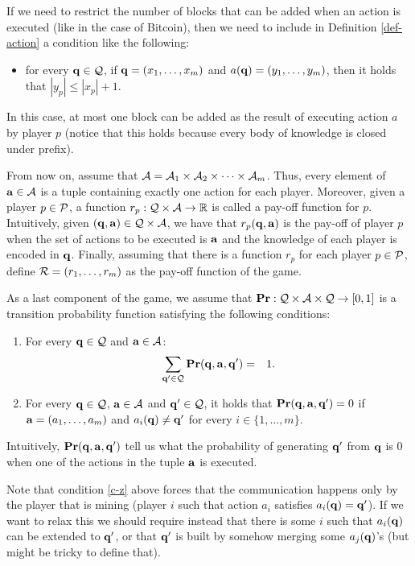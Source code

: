 If we need to restrict the number of blocks that can be added when an action is executed (like in the case of Bitcoin), then we need to include in Definition \ref{def-action} a condition like the following:
\begin{itemize}
\item for every $\mathbf{q} \in \mathcal{Q}$, if $\mathbf{q} = (x_1, \ldots, x_m)$ and $a(\mathbf{q}) = (y_1, \ldots, y_m)$, then it holds that $|y_p| \leq |x_p| + 1$.
\end{itemize}
In this case, at most one block can be added as the result of executing action $a$ by player $p$ (notice that this holds because every body of knowledge is closed under prefix).

From now on, assume that $\mathcal{A} = \mathcal{A}_{1} \times \mathcal{A}_{2} \times \cdots \times \mathcal{A}_{m}$. Thus, every element of $\mathbf{a} \in \mathcal{A}$ is a tuple containing exactly one action for each player. Moreover, given a player $p \in \mathcal{P}$, a function $r_p : \mathcal{Q} \times \mathcal{A} \to \mathbb{R}$ is called a pay-off function for $p$. Intuitively, given $(\mathbf{q}, \mathbf{a}) \in \mathcal{Q} \times \mathcal{A}$, we have that $r_p(\mathbf{q}, \mathbf{a})$ is the pay-off of player $p$ when the set of actions to be executed is $\mathbf{a}$ and the knowledge of each player is encoded in $\mathbf{q}$. Finally, assuming that there is a  function $r_p$ for each player $p \in \mathcal{P}$, define $\mathcal{R} = (r_1, \ldots, r_m)$ as the pay-off function of the game.

As a last component of the game, we assume that $\mathbf{Pr} : \mathcal{Q} \times \mathcal{A} \times \mathcal{Q} \to [0,1]$ is a transition probability function satisfying the following conditions:
\begin{enumerate}
\item For every $\mathbf{q} \in \mathcal{Q}$ and $\mathbf{a} \in \mathcal{A}$:
\begin{eqnarray*}
\sum_{\mathbf{q}' \in \mathcal{Q}} \mathbf{Pr}(\mathbf{q}, \mathbf{a}, \mathbf{q}' ) & = & 1.
\end{eqnarray*}

\item \label{c-z} For every $\mathbf{q} \in \mathcal{Q}$, $\mathbf{a} \in \mathcal{A}$ and $\mathbf{q}' \in \mathcal{Q}$, it holds that $\mathbf{Pr}(\mathbf{q}, \mathbf{a}, \mathbf{q}') = 0$ if $\mathbf{a} = (a_1, \ldots, a_m)$ and $a_i(\mathbf{q}) \neq \mathbf{q}'$ for every $i \in \{1, \ldots, m\}$.
\end{enumerate}
Intuitively, $\mathbf{Pr}(\mathbf{q}, \mathbf{a}, \mathbf{q}')$ tell us what the probability of generating $\mathbf{q}'$ from $\mathbf{q}$ is 0 when one of the actions in the tuple $\mathbf{a}$ is executed.

Note that condition \ref{c-z} above forces that the communication happens only by the player that is mining (player $i$ such that 
action $a_i$ satisfies $a_i(\mathbf{q}) = \mathbf{q}'$). If we want to relax this we should require instead that there is some $i$ such that $a_i(\mathbf{q})$ can be extended to $\mathbf{q}'$, or that $\mathbf{q}'$ is built by somehow merging some $a_j(\mathbf{q})$'s (but might be tricky to define that).


